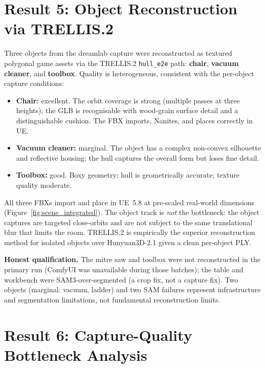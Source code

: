 \section{Result 5: Object Reconstruction via TRELLIS.2}
\label{sec:results:objects}

Three objects from the dreamlab capture were reconstructed as textured polygonal game
assets via the TRELLIS.2 \texttt{hull\_e2e} path: \textbf{chair}, \textbf{vacuum
cleaner}, and \textbf{toolbox}.  Quality is heterogeneous, consistent with the per-object
capture conditions:

\begin{itemize}
  \item \textbf{Chair:} excellent.  The orbit coverage is strong (multiple passes at
        three heights); the GLB is recognisable with wood-grain surface detail and a
        distinguishable cushion.  The FBX imports, Nanites, and places correctly in UE.
  \item \textbf{Vacuum cleaner:} marginal.  The object has a complex non-convex silhouette
        and reflective housing; the hull captures the overall form but loses fine detail.
  \item \textbf{Toolbox:} good.  Boxy geometry; hull is geometrically accurate; texture
        quality moderate.
\end{itemize}

All three FBXs import and place in UE~5.8 at pre-scaled real-world dimensions
(Figure~\ref{fig:scene_integrated}).  The object track is \emph{not} the bottleneck: the
object captures are targeted close-orbits and are not subject to the same translational
blur that limits the room.  TRELLIS.2 is empirically the superior reconstruction method
for isolated objects over Hunyuan3D-2.1 given a clean per-object PLY.

\textbf{Honest qualification.} The mitre saw and toolbox were not reconstructed in the
primary run (ComfyUI was unavailable during those batches); the table and workbench were
SAM3-over-segmented (a crop fix, not a capture fix).  Two objects (marginal: vacuum,
ladder) and two SAM failures represent infrastructure and segmentation limitations, not
fundamental reconstruction limits.

\section{Result 6: Capture-Quality Bottleneck Analysis}
\label{sec:results:bottleneck}

